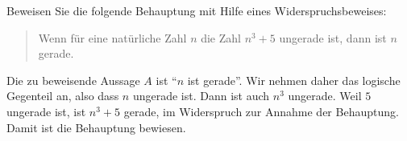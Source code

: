 Beweisen Sie die folgende Behauptung mit Hilfe eines Widerspruchsbeweises:
\begin{quote}
Wenn für eine natürliche Zahl $n$ die Zahl $n^3+5$ ungerade ist, dann ist
$n$ gerade.
\end{quote}

\begin{loesung}
Die zu beweisende Aussage $A$ ist ``$n$ ist gerade''.
Wir nehmen daher das logische Gegenteil an, also
dass $n$ ungerade ist.
Dann ist auch $n^3$ ungerade.
Weil $5$ ungerade ist, ist $n^3+5$ gerade, im Widerspruch zur Annahme
der Behauptung.
Damit ist die Behauptung bewiesen.
\end{loesung}
